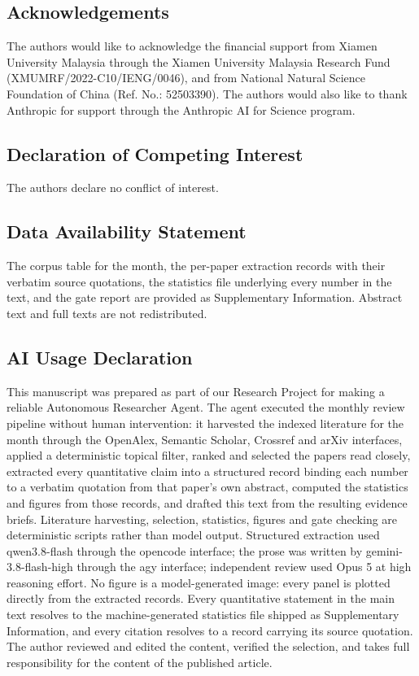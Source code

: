 \documentclass[
  11pt,
]{article}
\begin{document}
\subsection{Acknowledgements}\label{acknowledgements}

The authors would like to acknowledge the financial support from Xiamen
University Malaysia through the Xiamen University Malaysia Research Fund
(XMUMRF/2022-C10/IENG/0046), and from National Natural Science
Foundation of China (Ref. No.: 52503390). The authors would also like to
thank Anthropic for support through the Anthropic AI for Science
program.

\subsection{Declaration of Competing
Interest}\label{declaration-of-competing-interest}

The authors declare no conflict of interest.

\subsection{Data Availability
Statement}\label{data-availability-statement}

The corpus table for the month, the per-paper extraction records with
their verbatim source quotations, the statistics file underlying every
number in the text, and the gate report are provided as Supplementary
Information. Abstract text and full texts are not redistributed.

\subsection{AI Usage Declaration}\label{ai-usage-declaration}

This manuscript was prepared as part of our Research Project for making
a reliable Autonomous Researcher Agent. The agent executed the monthly
review pipeline without human intervention: it harvested the indexed
literature for the month through the OpenAlex, Semantic Scholar,
Crossref and arXiv interfaces, applied a deterministic topical filter,
ranked and selected the papers read closely, extracted every
quantitative claim into a structured record binding each number to a
verbatim quotation from that paper's own abstract, computed the
statistics and figures from those records, and drafted this text from
the resulting evidence briefs. Literature harvesting, selection,
statistics, figures and gate checking are deterministic scripts rather
than model output. Structured extraction used qwen3.8-flash through the
opencode interface; the prose was written by gemini-3.8-flash-high
through the agy interface; independent review used Opus 5 at high
reasoning effort. No figure is a model-generated image: every panel is
plotted directly from the extracted records. Every quantitative
statement in the main text resolves to the machine-generated statistics
file shipped as Supplementary Information, and every citation resolves
to a record carrying its source quotation. The author reviewed and
edited the content, verified the selection, and takes full
responsibility for the content of the published article.
\end{document}
